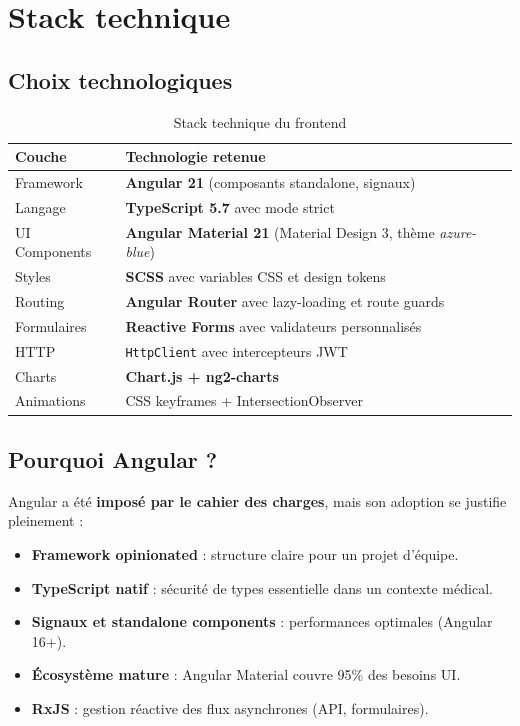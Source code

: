 \documentclass[11pt,a4paper]{article}
\begin{document}
\newpage

\section{Stack technique}

\subsection{Choix technologiques}

\begin{table}[H]
\centering
\renewcommand{\arraystretch}{1.5}
\begin{tabularx}{\textwidth}{>{\columncolor{lightgray}}lX}
\toprule
\rowcolor{primary!10}
\textbf{Couche} & \textbf{Technologie retenue} \\
\midrule
Framework & \textbf{Angular 21} (composants standalone, signaux) \\
Langage & \textbf{TypeScript 5.7} avec mode strict \\
UI Components & \textbf{Angular Material 21} (Material Design 3, thème \emph{azure-blue}) \\
Styles & \textbf{SCSS} avec variables CSS et design tokens \\
Routing & \textbf{Angular Router} avec lazy-loading et route guards \\
Formulaires & \textbf{Reactive Forms} avec validateurs personnalisés \\
HTTP & \texttt{HttpClient} avec intercepteurs JWT \\
Charts & \textbf{Chart.js + ng2-charts} \\
Animations & CSS keyframes + IntersectionObserver \\
\bottomrule
\end{tabularx}
\caption{Stack technique du frontend}
\end{table}

\subsection{Pourquoi Angular ?}

Angular a été \textbf{imposé par le cahier des charges}, mais son adoption se
justifie pleinement :

\begin{itemize}
  \item \textbf{Framework opinionated} : structure claire pour un projet d'équipe.
  \item \textbf{TypeScript natif} : sécurité de types essentielle dans un contexte médical.
  \item \textbf{Signaux et standalone components} : performances optimales (Angular 16+).
  \item \textbf{Écosystème mature} : Angular Material couvre 95\% des besoins UI.
  \item \textbf{RxJS} : gestion réactive des flux asynchrones (API, formulaires).
\end{itemize}
\end{document}
